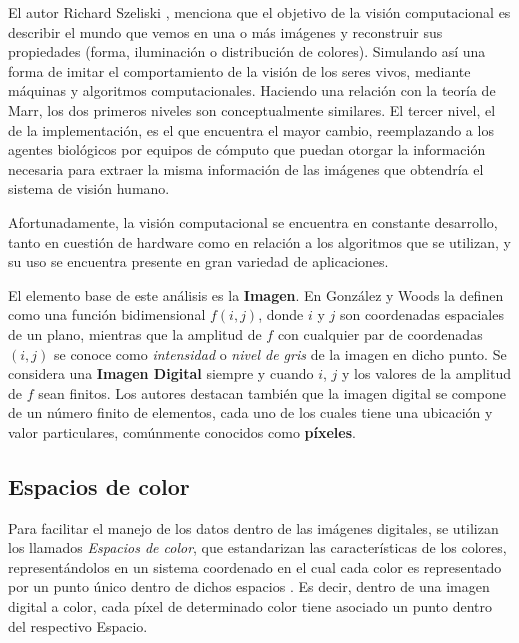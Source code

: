 El autor Richard Szeliski \cite{szeliski_computer_2022}, menciona que el objetivo de la visión computacional es describir el mundo que vemos en una o más imágenes y reconstruir sus propiedades (forma, iluminación o distribución de colores). Simulando así una forma de imitar el comportamiento de la visión de los seres vivos, mediante máquinas y algoritmos computacionales. Haciendo una relación con la teoría de Marr, los dos primeros niveles son conceptualmente similares. El tercer nivel, el de la implementación, es el que encuentra el mayor cambio, reemplazando a los agentes biológicos por equipos de cómputo que puedan otorgar la información necesaria para extraer la misma información de las imágenes que obtendría el sistema de visión humano.


Afortunadamente, la visión computacional se encuentra en constante desarrollo, tanto en cuestión de hardware como en relación a los algoritmos que se utilizan, y su uso se encuentra presente en gran variedad de aplicaciones.


El elemento base de este análisis es la \textbf{Imagen}. En \cite{gonzalez_digital_2002} González y Woods la definen como una función bidimensional $f(i,j)$, donde $i$ y $j$ son coordenadas espaciales de un plano, mientras que la amplitud de $f$ con cualquier par de coordenadas $(i,j)$ se conoce como \textit{intensidad} o \textit{nivel de gris} de la imagen en dicho punto. Se considera una \textbf{Imagen Digital} siempre y cuando $i$, $j$ y los valores de la amplitud de $f$ sean finitos. Los autores destacan también que la imagen digital se compone de un número finito de elementos, cada uno de los cuales tiene una ubicación y valor particulares, comúnmente conocidos como \textbf{píxeles}.

\subsection{Espacios de color}
Para facilitar el manejo de los datos dentro de las imágenes digitales, se utilizan los llamados \textit{Espacios de color}, que estandarizan las características de los colores, representándolos en un sistema coordenado en el cual cada color es representado por un punto único dentro de dichos espacios \cite{gonzalez_digital_2002}. Es decir, dentro de una imagen digital a color, cada píxel de determinado color tiene asociado un punto dentro del respectivo Espacio.

